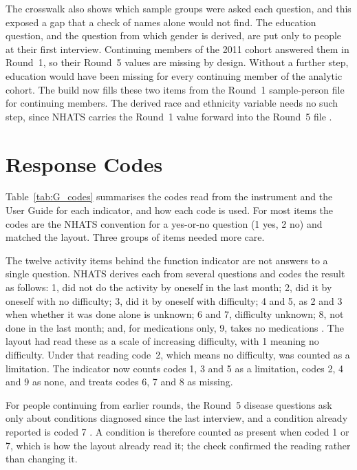 The crosswalk also shows which sample groups were asked each question, and
this exposed a gap that a check of names alone would not find. The education
question, and the question from which gender is derived, are put only to people
at their first interview. Continuing members of the 2011 cohort answered them
in Round~1, so their Round~5 values are missing by design. Without a further
step, education would have been missing for every continuing member of the
analytic cohort. The build now fills these
two items from the Round~1 sample-person file for continuing members. The
derived race and ethnicity variable needs no such step, since NHATS carries the
Round~1 value forward into the Round~5 file \citep{freedman_nhats_userguide_2026}.

\section{Response Codes}
\label{sec:G_codes}

Table~\ref{tab:G_codes} summarises the codes read from the instrument and the
User Guide for each indicator, and how each code is used. For most items the
codes are the NHATS convention for a yes-or-no question (1 yes, 2 no) and
matched the layout. Three groups of items needed more care.

The twelve activity items behind the function indicator are not answers to a
single question. NHATS derives each from several questions and codes the result
as follows: 1, did not do the activity by oneself in the last month; 2, did it
by oneself with no difficulty; 3, did it by oneself with difficulty; 4 and 5,
as 2 and 3 when whether it was done alone is unknown; 6 and 7, difficulty
unknown; 8, not done in the last month; and, for medications only, 9, takes no
medications \citep{freedman_nhats_userguide_2026}. The layout had read these
as a scale of increasing difficulty, with 1 meaning no difficulty. Under that
reading code~2, which means no difficulty, was counted as a limitation. The
indicator now counts codes 1, 3 and 5 as a limitation, codes 2, 4 and 9 as
none, and treats codes 6, 7 and 8 as missing.

For people continuing from earlier rounds, the Round~5 disease questions ask
only about conditions diagnosed since the last interview, and a condition
already reported is coded 7 \citep{nhats_r5_instrument_2024}. A condition is
therefore counted as present when coded 1 or 7, which is how the layout
already read it; the check confirmed the reading rather than changing it.

